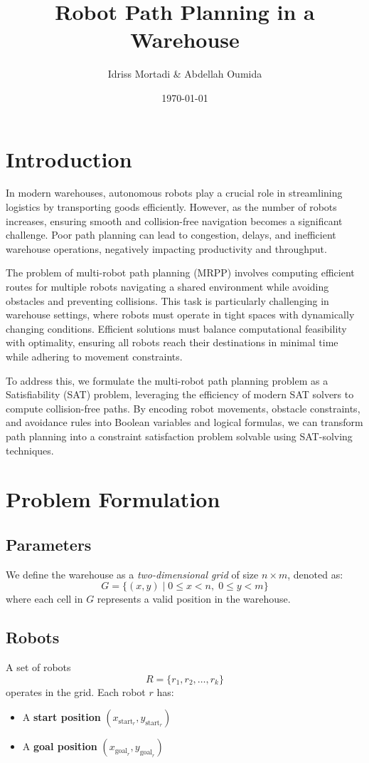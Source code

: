 \documentclass[8pt]{article}
\title{Robot Path Planning in a Warehouse}
\author{Idriss Mortadi \& Abdellah Oumida}
\date{\today}
\begin{document}
\maketitle

\section{Introduction}
In modern warehouses, autonomous robots play a crucial role in streamlining logistics by transporting goods efficiently. However, as the number of robots increases, ensuring smooth and collision-free navigation becomes a significant challenge. Poor path planning can lead to congestion, delays, and inefficient warehouse operations, negatively impacting productivity and throughput.

The problem of multi-robot path planning (MRPP) involves computing efficient routes for multiple robots navigating a shared environment while avoiding obstacles and preventing collisions. This task is particularly challenging in warehouse settings, where robots must operate in tight spaces with dynamically changing conditions. Efficient solutions must balance computational feasibility with optimality, ensuring all robots reach their destinations in minimal time while adhering to movement constraints.

To address this, we formulate the multi-robot path planning problem as a Satisfiability (SAT) problem, leveraging the efficiency of modern SAT solvers to compute collision-free paths. By encoding robot movements, obstacle constraints, and avoidance rules into Boolean variables and logical formulas, we can transform path planning into a constraint satisfaction problem solvable using SAT-solving techniques.

\section{Problem Formulation}

\subsection{Parameters}
We define the warehouse as a \emph{two-dimensional grid} of size $n \times m$, denoted as:
\[
G = \{(x,y) \mid 0 \leq x < n, \; 0 \leq y < m\}
\]
where each cell in $G$ represents a valid position in the warehouse.

\subsection{Robots}
A set of robots 
\[
R = \{r_1, r_2, \dots, r_k\}
\]
operates in the grid. Each robot $r$ has:
\begin{itemize}
    \item A \textbf{start position} $(x_{\text{start}_r}, y_{\text{start}_r})$
    \item A \textbf{goal position} $(x_{\text{goal}_r}, y_{\text{goal}_r})$
\end{itemize}
\end{document}
